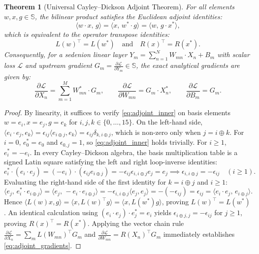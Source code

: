 \documentclass[11pt,a4paper]{article}
\newtheorem{theorem}{Theorem}[section]
\theoremstyle{definition}
\theoremstyle{remark}
\newcommand{\Se}{\mathbb{S}}
\begin{document}
\begin{theorem}[Universal Cayley--Dickson Adjoint Theorem]
\label{thm:adjoint}
For all elements $w, x, g \in \Se$, the bilinear product satisfies the Euclidean adjoint identities:
\begin{equation}
\label{eq:adjoint_inner}
\langle w \cdot x, \, g \rangle = \langle x, \, w^* \cdot g \rangle = \langle w, \, g \cdot x^* \rangle,
\end{equation}
which is equivalent to the operator transpose identities:
\begin{equation}
\label{eq:adjoint_matrix}
L(w)^\top = L(w^*) \quad \text{and} \quad R(x)^\top = R(x^*).
\end{equation}
Consequently, for a sedenion linear layer $Y_m = \sum_{n=1}^N W_{mn} \cdot X_n + B_m$ with scalar loss $\mathcal{L}$ and upstream gradient $G_m = \frac{\partial \mathcal{L}}{\partial Y_m} \in \Se$, the exact analytical gradients are given by:
\begin{equation}
\label{eq:adjoint_gradients}
\frac{\partial \mathcal{L}}{\partial X_n} = \sum_{m=1}^M W_{mn}^* \cdot G_m, \qquad \frac{\partial \mathcal{L}}{\partial W_{mn}} = G_m \cdot X_n^*, \qquad \frac{\partial \mathcal{L}}{\partial B_m} = G_m.
\end{equation}
\end{theorem}

\begin{proof}
By linearity, it suffices to verify \eqref{eq:adjoint_inner} on basis elements $w = e_i, x = e_j, g = e_k$ for $i, j, k \in \{0, \dots, 15\}$. On the left-hand side, $\langle e_i \cdot e_j, e_k \rangle = \epsilon_{ij} \langle e_{i \oplus j}, e_k \rangle = \epsilon_{ij} \delta_{k, i \oplus j}$, which is non-zero only when $j = i \oplus k$. For $i = 0$, $e_0^* = e_0$ and $\epsilon_{0,j} = 1$, so \eqref{eq:adjoint_inner} holds trivially. For $i \ge 1$, $e_i^* = -e_i$. In every Cayley--Dickson algebra, the basis multiplication table is a signed Latin square satisfying the left and right loop-inverse identities:
\[
e_i^* \cdot (e_i \cdot e_j) = (-e_i) \cdot (\epsilon_{ij} e_{i \oplus j}) = -\epsilon_{ij} \epsilon_{i, i \oplus j} e_j = e_j \implies \epsilon_{i, i \oplus j} = -\epsilon_{ij} \quad (i \ge 1).
\]
Evaluating the right-hand side of the first identity for $k = i \oplus j$ and $i \ge 1$:
\[
\langle e_j, \, e_i^* \cdot e_{i \oplus j} \rangle = \langle e_j, \, -e_i \cdot e_{i \oplus j} \rangle = -\epsilon_{i, i \oplus j} \langle e_j, e_j \rangle = -(-\epsilon_{ij}) = \epsilon_{ij} = \langle e_i \cdot e_j, \, e_{i \oplus j} \rangle.
\]
Hence $\langle L(w)x, g \rangle = \langle x, L(w)^\top g \rangle = \langle x, L(w^*)g \rangle$, proving $L(w)^\top = L(w^*)$. An identical calculation using $(e_i \cdot e_j) \cdot e_j^* = e_i$ yields $\epsilon_{i \oplus j, j} = -\epsilon_{ij}$ for $j \ge 1$, proving $R(x)^\top = R(x^*)$. Applying the vector chain rule $\frac{\partial \mathcal{L}}{\partial X_n} = \sum_m L(W_{mn})^\top G_m$ and $\frac{\partial \mathcal{L}}{\partial W_{mn}} = R(X_n)^\top G_m$ immediately establishes \eqref{eq:adjoint_gradients}.
\end{proof}
\end{document}
